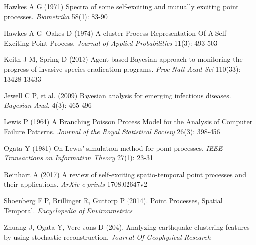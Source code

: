 \documentclass[11pt,a4paper]{article}
\begin{document}
\begin{thebibliography}{99}

 Hawkes A G (1971) Spectra of some self-exciting and mutually exciting point processes. \textit{Biometrika} 58(1): 83-90

 Hawkes A G, Oakes D (1974) A cluster Process Representation Of A Self-Exciting Point Process. \textit{Journal of Applied Probabilities} 11(3): 493-503

 Keith J M, Spring D (2013) Agent-based Bayesian approach to monitoring the progress of invasive species eradication programs. \textit{Proc Natl Acad Sci} 110(33): 13428-13433

 Jewell C P, et al. (2009) Bayesian analysis for emerging infectious diseases. \textit{Bayesian Anal.} 4(3): 465-496

 Lewis P (1964) A Branching Poisson Process Model for the Analysis of Computer Failure Patterns. \textit{Journal of the Royal Statistical Society} 26(3): 398-456

 Ogata Y (1981) On Lewis' simulation method for point processes. \textit{IEEE Transactions on Information Theory} 27(1): 23-31

 Reinhart A (2017) A review of self-exciting spatio-temporal point processes and their applications. \textit{ArXiv e-prints} 1708.02647v2

 Shoenberg F P, Brillinger R, Guttorp P (2014). Point Processes, Spatial Temporal. \textit{Encyclopedia of Environmetrics}

 Zhuang J, Ogata Y, Vere-Jons D (204). Analyzing earthquake clustering features by using stochastic reconstruction. \textit{Journal Of Geophysical Research}

\end{thebibliography}
\end{document}
